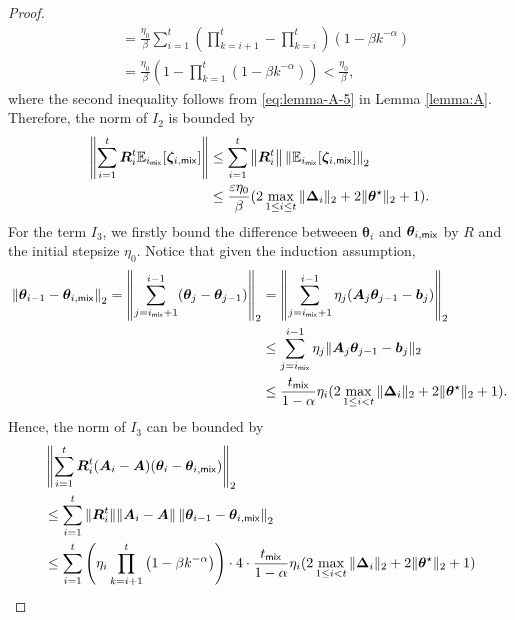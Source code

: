 \begin{proof}
\begin{align*}
&= \frac{\eta_0}{\beta} \sum_{i=1}^t \left(\prod_{k=i+1}^t - \prod_{k=i}^t\right)(1-\beta k^{-\alpha}) \\ 
&= \frac{\eta_0}{\beta}\left(1-\prod_{k=1}^t (1-\beta k^{-\alpha})\right) < \frac{\eta_0}{\beta},
\end{align*}
where the second inequality follows from \eqref{eq:lemma-A-5} in Lemma \ref{lemma:A}.
Therefore, the norm of $I_2$ is bounded by 
\begin{align}\label{eq:markov-deltat-I2-bound}
\left\| \sum_{i=1}^t \bm{R}_i^t \mathbb{E}_{i_{\mathsf{mix}}}[\bm{\zeta}_{i,\mathsf{mix}}] \right\|&\leq \sum_{i=1}^t \left\|\bm{R}_i^t\right\| \left\|\mathbb{E}_{i_{\mathsf{mix}}}[\bm{\zeta}_{i,\mathsf{mix}}]\right\|_2 \nonumber \\ 
&\leq \frac{\varepsilon \eta_0}{\beta} (2\max_{1 \leq i \leq t}\|\bm{\Delta}_i\|_2 + 2\|\bm{\theta}^\star\|_2  + 1).
\end{align}
For the term $I_3$, we firstly bound the difference betweeen $\bm{\theta}_i$ and $\bm{\theta}_{i,\mathsf{mix}}$ by $R$ and the initial stepsize $\eta_0$. Notice that given the induction assumption, 
\begin{align*}
\left\|\bm{\theta}_{i-1} - \bm{\theta}_{i,\mathsf{mix}}\right\|_2 = \left\|\sum_{j=i_{\mathsf{mix}}+1}^{i-1} (\bm{\theta}_{j} - \bm{\theta}_{j-1}) \right\|_2 &= \left\| \sum_{j=i_{\mathsf{mix}}+1}^{i-1} \eta_j (\bm{A}_j \bm{\theta}_{j-1} - \bm{b}_j)\right\|_2 \\ 
&\leq \sum_{j=i_{\mathsf{mix}}}^{i-1} \eta_j \|\bm{A}_j \bm{\theta}_{j-1} - \bm{b}_j\|_2 \\ 
&\leq \frac{t_{\mathsf{mix}}}{1-\alpha} \eta_i (2 \max_{1 \leq i < t} \|\bm{\Delta}_i\|_2 + 2\|\bm{\theta}^\star\|_2  + 1).
\end{align*}
Hence, the norm of $I_{3}$ can be bounded by
\begin{align}\label{eq:markov-deltat-I3-bound}
&\left\|\sum_{i=1}^t \bm{R}_i^t (\bm{A}_i - \bm{A}) (\bm{\theta}_i - \bm{\theta}_{i,\mix})\right\|_2  \nonumber \\
& \leq \sum_{i=1}^t \|\bm{R}_i^t\| \|\bm{A}_i - \bm{A}\| \left\|\bm{\theta}_{i-1} - \bm{\theta}_{i,\mix}\right\|_2 \nonumber \\ 
&\leq \sum_{i=1}^t \left(\eta_i \prod_{k=i+1}^t \left(1-\beta k^{-\alpha} \right)\right) \cdot 4 \cdot \frac{t_{\mix}}{1-\alpha} \eta_i (2 \max_{1 \leq i < t} \|\bm{\Delta}_i\|_2 + 2\|\bm{\theta}^\star\|_2  + 1)\nonumber \\ 

\end{align}
\end{proof}
